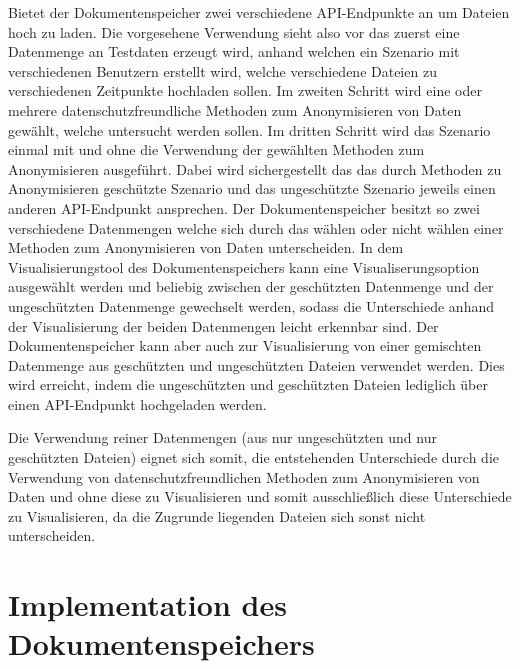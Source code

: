 \documentclass[
    fontsize=12pt,
    headings=small,
    parskip=half,           %
    bibliography=totoc,
    numbers=noenddot,       %
    open=any,               %
    ]{scrreprt}
\begin{document}
Bietet der Dokumentenspeicher zwei verschiedene \ac{API}-Endpunkte an um Dateien hoch zu laden.
Die vorgesehene Verwendung sieht also vor das zuerst eine Datenmenge an Testdaten erzeugt wird, anhand welchen ein Szenario mit verschiedenen Benutzern erstellt wird, welche verschiedene Dateien zu verschiedenen Zeitpunkte hochladen sollen. 
Im zweiten Schritt wird eine oder mehrere datenschutzfreundliche Methoden zum Anonymisieren von Daten gewählt, welche untersucht werden sollen.
Im dritten Schritt wird das Szenario einmal mit und ohne die Verwendung der gewählten Methoden zum Anonymisieren ausgeführt. 
Dabei wird sichergestellt das das durch Methoden zu Anonymisieren geschützte Szenario und das ungeschützte Szenario jeweils einen anderen \ac{API}-Endpunkt ansprechen.
Der Dokumentenspeicher besitzt so zwei verschiedene Datenmengen welche sich durch das wählen oder nicht wählen einer Methoden zum Anonymisieren von Daten unterscheiden.
In dem Visualisierungstool des Dokumentenspeichers kann eine Visualiserungsoption ausgewählt werden und beliebig zwischen der geschützten Datenmenge und der ungeschützten Datenmenge gewechselt werden, sodass die Unterschiede anhand der Visualisierung der beiden Datenmengen leicht erkennbar sind.
Der Dokumentenspeicher kann aber auch zur Visualisierung von einer gemischten Datenmenge aus geschützten und ungeschützten Dateien verwendet werden. Dies wird erreicht, indem die ungeschützten und geschützten Dateien lediglich über einen \ac{API}-Endpunkt hochgeladen werden.

Die Verwendung reiner Datenmengen (aus nur ungeschützten und nur geschützten Dateien) eignet sich somit, die entstehenden Unterschiede durch die Verwendung von datenschutzfreundlichen Methoden zum Anonymisieren von Daten und ohne diese zu Visualisieren und somit ausschließlich diese Unterschiede zu Visualisieren, da die Zugrunde liegenden Dateien sich sonst nicht unterscheiden. 

    \section{Implementation des Dokumentenspeichers}    
    
\end{document}
